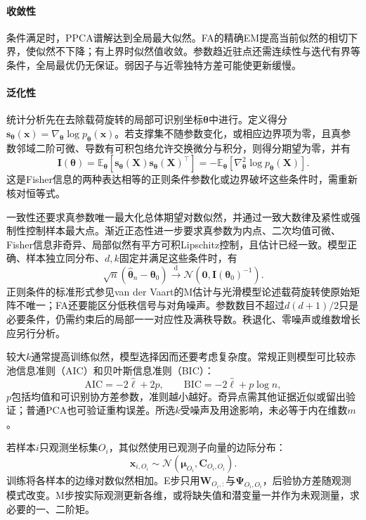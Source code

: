 \paragraph{收敛性}

条件满足时，PPCA谱解达到全局最大似然。FA的精确EM提高当前似然的相切下界，使似然不下降；有上界时似然值收敛。参数趋近驻点还需连续性与迭代有界等条件，全局最优仍无保证。弱因子与近零独特方差可能使更新缓慢。

\paragraph{泛化性}

统计分析先在去除载荷旋转的局部可识别坐标$\bm{\theta}$中进行。定义得分$\bm{s}_{\bm{\theta}}(\bm{x})=\nabla_{\bm{\theta}}\log p_{\bm{\theta}}(\bm{x})$。若支撑集不随参数变化，或相应边界项为零，且真参数邻域二阶可微、导数有可积包络允许交换微分与积分，则得分期望为零，并有
\[
  \bm{I}(\bm{\theta})
  =\mathbb{E}_{\bm{\theta}}\!\left[
      \bm{s}_{\bm{\theta}}(\bm{X})
      \bm{s}_{\bm{\theta}}(\bm{X})^{\top}
    \right]
  =-\mathbb{E}_{\bm{\theta}}\!\left[
      \nabla_{\bm{\theta}}^2\log p_{\bm{\theta}}(\bm{X})
    \right].
\]
这是Fisher信息的两种表达相等的正则条件参数化或边界破坏这些条件时，需重新核对恒等式。

一致性还要求真参数唯一最大化总体期望对数似然，并通过一致大数律及紧性或强制性控制样本最大点。渐近正态性进一步要求真参数为内点、二次均值可微、Fisher信息非奇异、局部似然有平方可积Lipschitz控制，且估计已经一致。模型正确、样本独立同分布、$d,k$固定并满足这些条件时，有
\[
  \sqrt{n}(\widehat{\bm{\theta}}_n-\bm{\theta}_0)
  \xrightarrow{\mathrm d}
  \mathcal{N}\!\left(
    \bm{0},\bm{I}(\bm{\theta}_0)^{-1}
  \right).
\]
正则条件的标准形式参见van der Vaart的M估计与光滑模型论述载荷旋转使原始矩阵不唯一；FA还要能区分低秩信号与对角噪声。参数数目不超过$d(d+1)/2$只是必要条件，仍需约束后的局部一一对应性及满秩导数。秩退化、零噪声或维数增长应另行分析。

较大$k$通常提高训练似然，模型选择因而还要考虑复杂度。常规正则模型可比较赤池信息准则（AIC）和贝叶斯信息准则（BIC）：
\[
\mathrm{AIC}=-2\hat{\ell}+2p,\qquad
\mathrm{BIC}=-2\hat{\ell}+p\log n,
\]
$p$包括均值和可识别协方差参数，准则越小越好。奇异点需其他证据近似或留出验证；普通PCA也可验证重构误差。所选$k$受噪声及用途影响，未必等于内在维数$m$。

若样本$i$只观测坐标集$O_i$，其似然使用已观测子向量的边际分布：
\begin{equation}
\label{eq:dim-linear-missing}
\bm{x}_{i,O_i}\sim
\mathcal{N}(\bm{\mu}_{O_i},\bm{C}_{O_i,O_i}).
\end{equation}
训练将各样本的边缘对数似然相加。E步只用$\bm{W}_{O_i,:}$与$\bm{\Psi}_{O_i,O_i}$，后验协方差随观测模式改变。M步按实际观测更新各维，或将缺失值和潜变量一并作为未观测量，求必要的一、二阶矩。

